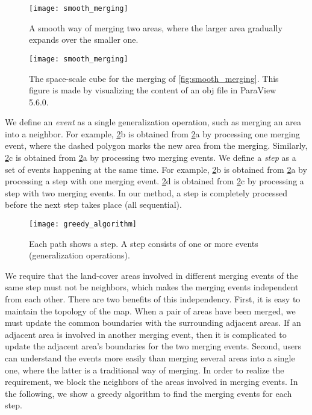 \documentclass[ijgi,article,submit,moreauthors,pdftex]{Definitions/mdpi}
\begin{document}
\begin{figure}[tb]
\centering
\texttt{[image: smooth\_merging]}
\caption{A smooth way of merging two areas,
    where the larger area gradually expands over the smaller one.}
\label{fig:smooth_merging}
%
\vspace{6mm}
%
\centering
\texttt{[image: smooth\_merging]}
\caption{The space-scale cube for the merging 
    of \fig\ref{fig:smooth_merging}.
    This figure is made by visualizing the content of an obj file in 
    ParaView 5.6.0.}
\label{fig:smooth_merging_ssc}
\end{figure}


We define an \emph{event} as a single generalization operation, 
such as merging an area into a neighbor.
For example, \fig\ref{fig:event_and_step}b is obtained from 
\fig\ref{fig:event_and_step}a by processing one merging event,
where the dashed polygon marks the new area from the merging.
Similarly, \fig\ref{fig:event_and_step}c is obtained from 
\fig\ref{fig:event_and_step}a by processing two merging events.
We define a \emph{step} as 
a set of events happening at the same time.
For example, 
\fig\ref{fig:event_and_step}b is obtained from 
\fig\ref{fig:event_and_step}a by processing a step with one merging event.
\fig\ref{fig:event_and_step}d is obtained from 
\fig\ref{fig:event_and_step}c by processing a step with two merging events.
In our method, a step is completely processed 
before the next step takes place (all sequential). 

\begin{figure}[tb]
\centering
\texttt{[image: greedy\_algorithm]}
\caption{Each path shows a step. 
A step consists of one or more events (generalization operations).}
\label{fig:event_and_step}
\end{figure}


We require that 
the land-cover areas involved in different merging events of the same step 
must not be neighbors, 
which makes the merging events independent from each other.
There are two benefits of this independency.
First, it is easy to maintain the topology of the map.
When a pair of areas have been merged, 
we must update the common boundaries with the surrounding adjacent areas.
If an adjacent area is involved in another merging event,
then it is complicated to update the adjacent area's boundaries
for the two merging events.
Second, users can understand the events more easily 
than merging several areas into a single one,
where the latter is a traditional way of merging.
In order to realize the requirement, 
we block the neighbors of the areas involved in merging events.
In the following, we show a greedy algorithm 
to find the merging events for each step.
\end{document}
